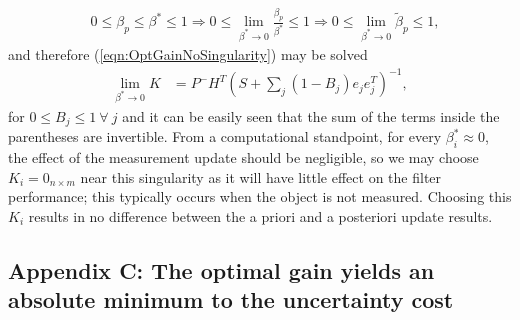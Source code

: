 \documentclass[letterpaper, paper,10pt]{AAS}		%
\newcommand{\refeqn}[1]{(\ref{eqn:#1})}
\begin{document}
\begin{appendix}
\begin{align}
&0\leq\beta_p\leq\beta^*\leq1\Rightarrow0\leq\lim_{\beta^* \to 0}\frac{\beta_p}{\beta^*}\leq1\Rightarrow0\leq\lim_{\beta^* \to 0}\tilde\beta_p\leq1,
\end{align}
and therefore \refeqn{OptGainNoSingularity} may be solved
\begin{align}
\lim_{\beta^* \to 0}K
&=P^-H^T
(S+\sum\limits_{j}(1-B_j)e_{j}e_{j}^T)^{-1},
\label{eqn:OptGainNoSingularitySolved}
\end{align}
for $0\leq B_j\leq1\ \forall\ j$ and it can be easily seen that the sum of the terms inside the parentheses are invertible.
From a computational standpoint, for every $\beta^*_i\approx0$, the effect of the measurement update should be negligible, so we may choose $K_i=0_{n\times m}$ near this singularity as it will have little effect on the filter performance; this typically occurs when the object is not measured.
Choosing this $K_i$ results in no difference between the a priori and a posteriori update results. 

\subsection{Appendix C: The optimal gain yields an absolute minimum to the uncertainty cost}


\end{appendix}
\end{document}
